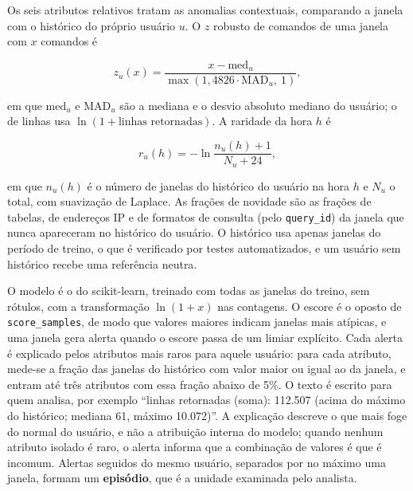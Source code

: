 Os seis atributos relativos tratam as anomalias contextuais, comparando a janela com o histórico
do próprio usuário $u$. O $z$ robusto de comandos de uma janela com $x$ comandos é

\begin{equation}
    z_u(x) = \frac{x - \mathrm{med}_u}{\max\left(1{,}4826 \cdot \mathrm{MAD}_u,\ 1\right)},
    \label{eq:zrobusto}
\end{equation}

\noindent em que $\mathrm{med}_u$ e $\mathrm{MAD}_u$ são a mediana e o desvio absoluto mediano
do usuário; o de linhas usa $\ln(1 + \text{linhas retornadas})$. A raridade da hora $h$ é

\begin{equation}
    r_u(h) = -\ln \frac{n_u(h) + 1}{N_u + 24},
    \label{eq:raridade}
\end{equation}

\noindent em que $n_u(h)$ é o número de janelas do histórico do usuário na hora $h$ e $N_u$ o
total, com suavização de Laplace. As frações de novidade são as frações de tabelas, de endereços
IP e de formatos de consulta (pelo \texttt{query\_id}) da janela que nunca apareceram no
histórico do usuário. O histórico usa apenas janelas do período de treino, o que é verificado por
testes automatizados, e um usuário sem histórico recebe uma referência neutra.

O modelo é o \iforest{} do scikit-learn, treinado com todas as janelas do treino, sem rótulos,
com a transformação $\ln(1+x)$ nas contagens. O escore é o oposto de \texttt{score\_samples}, de
modo que valores maiores indicam janelas mais atípicas, e uma janela gera alerta quando o escore
passa de um limiar explícito. Cada alerta é explicado pelos atributos mais raros para aquele
usuário: para cada atributo, mede-se a fração das janelas do histórico com valor maior ou igual
ao da janela, e entram até três atributos com essa fração abaixo de 5\%. O texto é escrito para
quem analisa, por exemplo ``linhas retornadas (soma): 112.507 (acima do máximo do histórico;
mediana 61, máximo 10.072)''. A explicação descreve o que mais foge do normal do usuário, e não a
atribuição interna do modelo; quando nenhum atributo isolado é raro, o alerta informa que a
combinação de valores é que é incomum. Alertas seguidos do mesmo usuário, separados por no
máximo uma janela, formam um \textbf{episódio}, que é a unidade examinada pelo analista.

